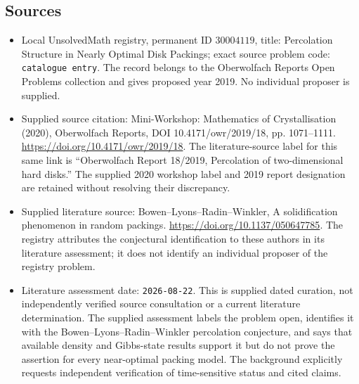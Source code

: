 \documentclass[11pt]{article}
\begin{document}
\subsection{Sources}
\begin{itemize}
\item Local UnsolvedMath registry, permanent ID \(30004119\), title: Percolation Structure in Nearly Optimal Disk Packings; exact source problem code: \texttt{catalogue entry}. The record belongs to the Oberwolfach Reports Open Problems collection and gives proposed year 2019. No individual proposer is supplied.
\item Supplied source citation: Mini-Workshop: Mathematics of Crystallisation (2020), Oberwolfach Reports, DOI 10.4171/owr/2019/18, pp. 1071--1111. \url{https://doi.org/10.4171/owr/2019/18}. The literature-source label for this same link is ``Oberwolfach Report 18/2019, Percolation of two-dimensional hard disks.'' The supplied 2020 workshop label and 2019 report designation are retained without resolving their discrepancy.
\item Supplied literature source: Bowen--Lyons--Radin--Winkler, A solidification phenomenon in random packings. \url{https://doi.org/10.1137/050647785}. The registry attributes the conjectural identification to these authors in its literature assessment; it does not identify an individual proposer of the registry problem.
\item Literature assessment date: \texttt{2026-08-22}. This is supplied dated curation, not independently verified source consultation or a current literature determination. The supplied assessment labels the problem open, identifies it with the Bowen--Lyons--Radin--Winkler percolation conjecture, and says that available density and Gibbs-state results support it but do not prove the assertion for every near-optimal packing model. The background explicitly requests independent verification of time-sensitive status and cited claims.
\end{itemize}
\end{document}
